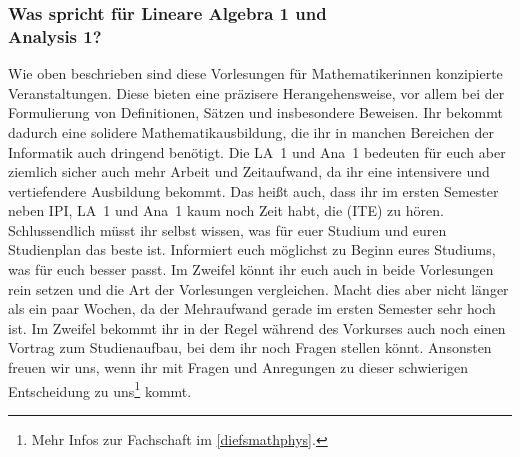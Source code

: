 \vspace{-1mm}
\subsubsection{Was spricht für Lineare Algebra 1 und\\Analysis 1?}
Wie oben beschrieben sind diese Vorlesungen für Mathematikerinnen konzipierte Veranstaltungen. Diese bieten eine präzisere Herangehensweise, vor allem bei der Formulierung von Definitionen, Sätzen und insbesondere Beweisen. Ihr bekommt dadurch eine solidere Mathematikausbildung, die ihr in manchen Bereichen der Informatik auch dringend benötigt. Die \gls{LA}~1 und \gls{Ana}~1 bedeuten für euch aber ziemlich sicher auch mehr Arbeit und Zeitaufwand, da ihr eine intensivere und vertiefendere Ausbildung bekommt. Das heißt auch, dass ihr im ersten Semester neben \gls{IPI}, \gls{LA}~1 und \gls{Ana}~1 kaum noch Zeit habt, die  (\gls{ITE}) zu hören.\\

Schlussendlich müsst ihr selbst wissen, was für euer Studium und euren Studienplan das beste ist. Informiert euch möglichst zu Beginn eures Studiums, was für euch besser passt. Im Zweifel könnt ihr euch auch in beide Vorlesungen rein setzen und die Art der Vorlesungen vergleichen. Macht dies aber nicht länger als ein paar Wochen, da der Mehraufwand gerade im ersten Semester sehr hoch ist. Im Zweifel bekommt ihr in der Regel während des Vorkurses auch noch einen Vortrag zum Studienaufbau, bei dem ihr noch Fragen stellen könnt. Ansonsten freuen wir uns, wenn ihr mit Fragen und Anregungen zu dieser schwierigen Entscheidung zu uns\footnote{Mehr Infos zur Fachschaft im \autoref{diefsmathphys}.} kommt.
